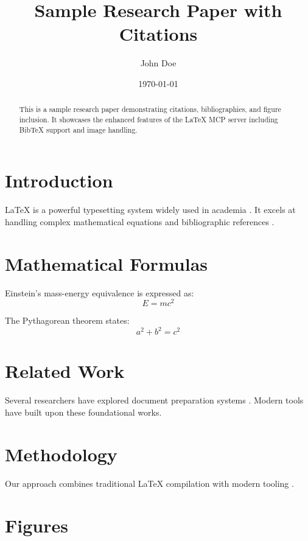 \documentclass[12pt]{article}
\title{Sample Research Paper with Citations}
\author{John Doe}
\date{\today}
\begin{document}
\maketitle

\begin{abstract}
This is a sample research paper demonstrating citations, bibliographies, and figure inclusion. It showcases the enhanced features of the LaTeX MCP server including BibTeX support and image handling.
\end{abstract}

\section{Introduction}

LaTeX is a powerful typesetting system widely used in academia \cite{lamport1994latex}. It excels at handling complex mathematical equations and bibliographic references \cite{knuth1984texbook}.

\section{Mathematical Formulas}

Einstein's mass-energy equivalence is expressed as:
\begin{equation}
E = mc^2
\end{equation}

The Pythagorean theorem states:
\begin{equation}
a^2 + b^2 = c^2
\end{equation}

\section{Related Work}

Several researchers have explored document preparation systems \cite{lamport1994latex, knuth1984texbook}. Modern tools have built upon these foundational works.

\section{Methodology}

Our approach combines traditional LaTeX compilation with modern tooling \cite{lamport1994latex}.

\section{Figures}
\end{document}
